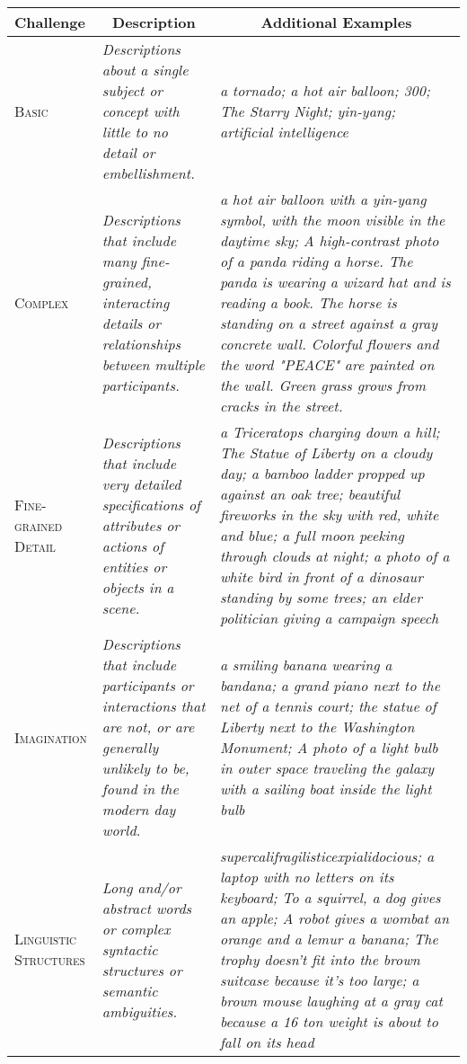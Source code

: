 \begin{table*}
\centering
\renewcommand{\arraystretch}{1.5}
\begin{adjustbox}{center}
\begin{tabular}{p{1.8cm}p{5.2cm}p{9.5cm}}
\toprule
Challenge & \multicolumn{1}{c}{Description} & \multicolumn{1}{c}{Additional Examples} \\
\midrule
\textsc{Basic} & \textit{Descriptions about a single subject or concept with little to no detail or embellishment.} & \textit{a tornado; a hot air balloon; 300; The Starry Night; yin-yang; artificial intelligence} \\
\textsc{Complex} & \textit{Descriptions that include many fine-grained, interacting details or relationships between multiple participants.} & \textit{a hot air balloon with a yin-yang symbol, with the moon visible in the daytime sky; A high-contrast photo of a panda riding a horse. The panda is wearing a wizard hat and is reading a book. The horse is standing on a street against a gray concrete wall. Colorful flowers and the word "PEACE" are painted on the wall. Green grass grows from cracks in the street.} \\
\textsc{Fine-grained Detail} & \textit{Descriptions that include very detailed specifications of attributes or actions of entities or objects in a scene.} & \textit{a Triceratops charging down a hill; The Statue of Liberty on a cloudy day; a bamboo ladder propped up against an oak tree; beautiful fireworks in the sky with red, white and blue; a full moon peeking through clouds at night; a photo of a white bird in front of a dinosaur standing by some trees; an elder politician giving a campaign speech} \\
\textsc{Imagination} & \textit{Descriptions that include participants or interactions that are not, or are generally unlikely to be, found in the modern day world.} & \textit{a smiling banana wearing a bandana; a grand piano next to the net of a tennis court; the statue of Liberty next to the Washington Monument; A photo of a light bulb in outer space traveling the galaxy with a sailing boat inside the light bulb} \\
\textsc{Linguistic Structures} & \textit{Long and/or abstract words or complex syntactic structures or semantic ambiguities.} & \textit{supercalifragilisticexpialidocious; a laptop with no letters on its keyboard; To a squirrel, a dog gives an apple; A robot gives a wombat an orange and a lemur a banana; The trophy doesn't fit into the brown suitcase because it's too large; a brown mouse laughing at a gray cat because a 16 ton weight is about to fall on its head} \\

\end{tabular}
\end{adjustbox}
\end{table*}
